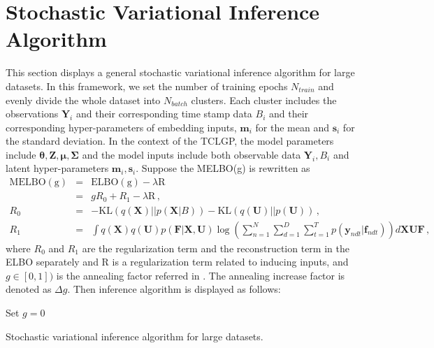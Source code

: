 \section{Stochastic Variational Inference Algorithm}
\label{sec: scia}
This section displays a general stochastic variational inference algorithm for large datasets. In this framework, we set the number of training epochs $N_{train}$ and evenly divide the whole dataset into $N_{batch}$ clusters. Each cluster includes the observations $\bm Y_i$ and their corresponding time stamp data $B_i$ and their corresponding hyper-parameters of embedding inputs, $\bm m_i$ for the mean and $\bm s_i$ for the standard deviation. In the context of the TCLGP, the model parameters include $\bm \theta, \bm Z, \bm \mu, \bm \Sigma$ and the model inputs include both observable data $\bm Y_i, B_i$ and latent hyper-parameters $\bm m_i, \bm s_i$. Suppose the MELBO(g) is rewritten as
\begin{eqnarray}
\mathrm{MELBO(g)} & = & \mathrm{ELBO(g)} - \lambda\mathrm{R} \nonumber \\
& = & gR_0 + R_1 - \lambda\mathrm{R}\,, \nonumber \\
R_0 & = & -\mathrm{KL}(q(\bm X) || p(\bm X | B)) - \mathrm{KL}(q(\bm U) || p(\bm U)) \,, \nonumber \\
R_1 & = & \int q(\bm X) q(\bm  U) p(\bm F | \bm X, \bm U) \log\left(\sum_{n = 1}^{N}\sum_{d = 1}^{D}\sum_{t = 1}^{T} p(\bm y_{ndt} | \bm f_{ndt})\right)d\bm X \bm U \bm F \,, \nonumber
\end{eqnarray}
where $R_0$ and $R_1$ are the regularization term and the reconstruction term 
in the ELBO separately and $\mathrm{R}$ is a regularization term related to inducing inputs, and $g\in[0,1])$ is the annealing factor referred in \cite{Bowman_2015}. The annealing increase factor is denoted as $\Delta g$. Then inference algorithm is displayed as follows: 

\begin{algorithm}[H]
	\SetAlgoLined
	Set $g = 0$\;
	\caption{Stochastic variational inference algorithm for large datasets.}
\end{algorithm}

